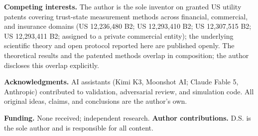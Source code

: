 \documentclass[11pt,twocolumn]{article}
\theoremstyle{plain}
\begin{document}
\textbf{Competing interests.} The author is the sole inventor on granted US utility patents covering trust-state measurement methods across financial, commercial, and insurance domains (US 12,236,480 B2; US 12,293,410 B2; US 12,307,515 B2; US 12,293,411 B2; assigned to a private commercial entity); the underlying scientific theory and open protocol reported here are published openly. The theoretical results and the patented methods overlap in composition; the author discloses this overlap explicitly.

\textbf{Acknowledgments.} AI assistants (Kimi K3, Moonshot AI; Claude Fable 5, Anthropic) contributed to validation, adversarial review, and simulation code. All original ideas, claims, and conclusions are the author's own.

\textbf{Funding.} None received; independent research. \textbf{Author contributions.} D.S. is the sole author and is responsible for all content.

\nocite{*}


\end{document}
